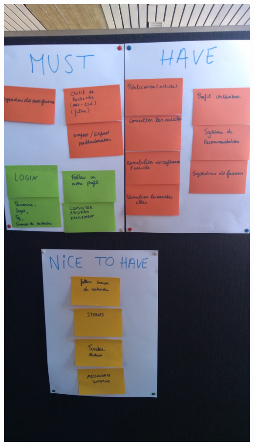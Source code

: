 \documentclass[t, 12pt, usenames,dvipsnames]{article}
\begin{document}
                                
                 \begin{center}                       \includegraphics[scale=.07]{images/sprint/must-nice-have.jpg}
                    \label{fig:sprint1_graph}
                \end{center}
                
                \newpage
                
\end{document}
